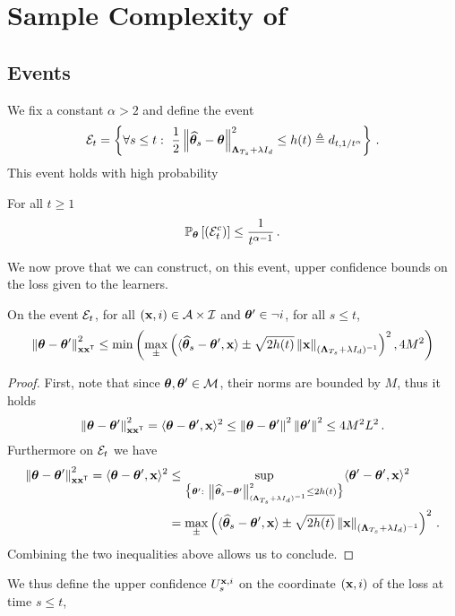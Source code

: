 \section{Sample Complexity of \LG{}}\label{app:lgc.proof}

\subsection{Events}\label{app:lgc.proof_nc.events}
We fix a constant $\alpha>2$ and define the event
\[
\cE_t = \left\{\forall s \leq  t:\ \frac{1}{2}\normm{\hbtheta_s-\btheta}^2_{\bLambda_{T_s}+\lambda I_d} \leq h(t)\eqdef d_{t,1/t^\alpha}\right\}\,.
\]
This event holds with high probability
\begin{lemma}
\label{lem:prb_Et_nc}
For all $t \geq 1$
\[
    \mathbb{P}_{\boldsymbol \theta}\left[\left(\mathcal{E}_t^c\right)\right]\leq \frac{1}{t^{\alpha-1}}\,.
\]
\end{lemma}
We now prove that we can construct, on this event, upper confidence bounds on the loss given to the learners.
\begin{lemma}
\label{lem:confidence_bound_general_nc}
On the event $\mathcal{E}_t$, for all $({\bf x},i)\in\mathcal{A}\times\mathcal{I}$ and ${\boldsymbol \theta}'\in\neg i$, for all $s\leq t$,
\[
\left\lVert{\boldsymbol \theta}-{\boldsymbol \theta}'\right\rVert^2_{{\bf x}{\bf x}^\mathsf{\scriptscriptstyle T}} \leq \min\left(\max_\pm \left( \langle \widehat{{\boldsymbol \theta}}_{s} - {\boldsymbol \theta}',{\bf x}\rangle \pm \sqrt{2 h(t)} \left\lVert{\bf x}\right\rVert_{({\boldsymbol \Lambda}_{T_s}+ \lambda I_d)^{-1}} \right)^2,4M^2\right)
\]
\end{lemma}
\begin{proof}
First, note that since ${\boldsymbol \theta},{\boldsymbol \theta}'\in\mathcal{M}$, their norms are bounded by $M$, thus it holds
\[
\left\lVert{\boldsymbol \theta}-{\boldsymbol \theta}'\right\rVert^2_{{\bf x}{\bf x}^\mathsf{\scriptscriptstyle T}} = \langle{\boldsymbol \theta}-{\boldsymbol \theta}',{\bf x} \rangle^2 \leq \left\lVert{\boldsymbol \theta}-{\boldsymbol \theta}'\right\rVert^2 \left\lVert{\boldsymbol \theta}'\right\rVert^2 \leq 4M^2L^2\,.
\]
Furthermore on $\mathcal{E}_t$ we have
\begin{align*}
\normm{\btheta-\btheta'}^2_{\bx\bx\transpose} = \langle\btheta-\btheta',\bx \rangle^2 &\leq \sup_{\big\{\btheta':\ \normm{\hbtheta_s-\btheta'}^2_{(\bLambda_{T_s} + \lambda I_d)^{-1} } \leq 2h(t)\big\}} \langle\btheta'-\btheta',\bx \rangle^2\\
&=\max_\pm \left( \langle \hbtheta_{s} - \btheta',\bx\rangle \pm \sqrt{2 h(t)} \normm{\bx}_{(\bLambda_{T_s}+ \lambda I_d)^{-1}} \right)^2\,.
\end{align*}
Combining the two inequalities above allows us to conclude.
\end{proof}
We thus define the upper confidence $U_s^{{\bf x},i}$ on the coordinate $({\bf x},i)$ of the loss at time $s\leq t$,
